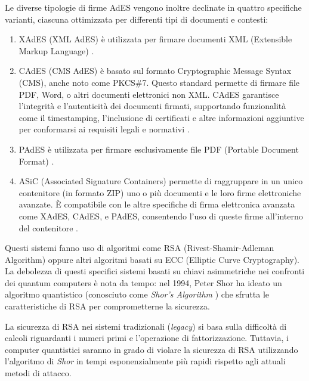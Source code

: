 Le diverse tipologie di firme AdES vengono inoltre declinate in quattro specifiche varianti, ciascuna ottimizzata per differenti tipi di documenti e contesti: 
\begin{enumerate}
    \item XAdES (XML AdES) è utilizzata per firmare documenti XML (Extensible Markup Language) \cite{etsi_ts_102918}.
    \item CAdES (CMS AdES) è basato sul formato Cryptographic Message Syntax (CMS), anche noto come PKCS\#7. Questo standard permette di firmare file PDF, Word, o altri documenti elettronici non XML. CAdES garantisce l'integrità e l'autenticità dei documenti firmati, supportando funzionalità come il timestamping, l'inclusione di certificati e altre informazioni aggiuntive per conformarsi ai requisiti legali e normativi \cite{etsi_ts_102918}   .
    \item PAdES è utilizzata per firmare esclusivamente file PDF (Portable Document Format) \cite{etsi_ts_319142}.
    \item ASiC (Associated Signature Containers) permette di raggruppare in un unico contenitore (in formato ZIP) uno o più documenti e le loro firme elettroniche avanzate. È compatibile con le altre specifiche di firma elettronica avanzata come XAdES, CAdES, e PAdES, consentendo l'uso di queste firme all'interno del contenitore \cite{etsi_ts_102918}.
\end{enumerate}

Questi sistemi fanno uso di algoritmi come RSA (Rivest-Shamir-Adleman Algorithm) oppure altri algoritmi basati su ECC (Elliptic Curve Cryptography). La debolezza di questi specifici sistemi basati su chiavi asimmetriche nei confronti dei quantum computers è nota da  tempo: nel 1994, Peter Shor ha ideato un algoritmo quantistico (conosciuto come \textit{Shor's Algorithm} \cite{nature-pqc}) che sfrutta le caratteristiche di RSA per comprometterne la sicurezza.

La sicurezza di RSA nei sistemi tradizionali (\textit{legacy}) si basa sulla difficoltà di calcoli riguardanti i numeri primi e l'operazione di fattorizzazione. Tuttavia, i computer quantistici saranno in grado di violare la sicurezza di RSA utilizzando l'algoritmo di \textit{Shor} in tempi esponenzialmente più rapidi rispetto agli attuali metodi di attacco.

